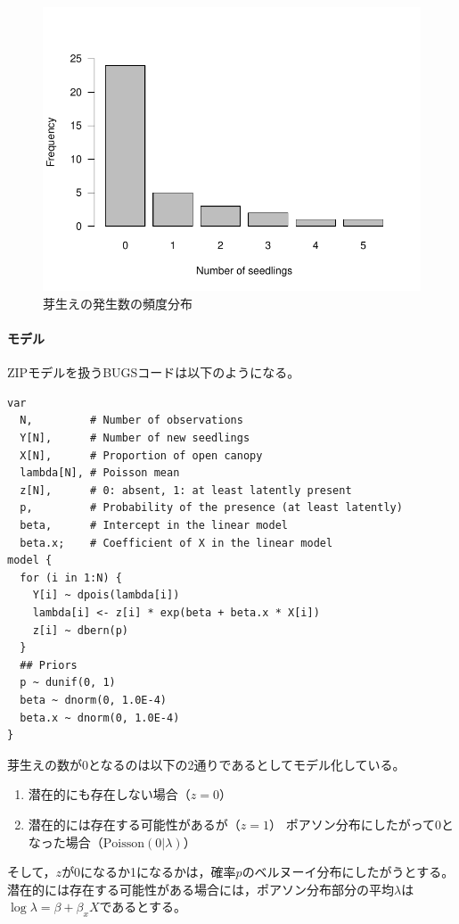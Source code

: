 \documentclass[11pt,uplatex]{jsarticle}
\begin{document}
\begin{figure}[hbtp]
  \begin{center}
    \includegraphics[bb=0 0 360 270, clip, width=300 bp]{example4_barplot.pdf}
  \end{center}
  \caption{芽生えの発生数の頻度分布}
  \label{example4_barplot}
\end{figure}


\paragraph{モデル}
ZIPモデルを扱うBUGSコードは以下のようになる。

\begin{lstlisting}
var
  N,         # Number of observations
  Y[N],      # Number of new seedlings
  X[N],      # Proportion of open canopy
  lambda[N], # Poisson mean
  z[N],      # 0: absent, 1: at least latently present
  p,         # Probability of the presence (at least latently)
  beta,      # Intercept in the linear model
  beta.x;    # Coefficient of X in the linear model
model {
  for (i in 1:N) {
    Y[i] ~ dpois(lambda[i])
    lambda[i] <- z[i] * exp(beta + beta.x * X[i])
    z[i] ~ dbern(p)
  }
  ## Priors
  p ~ dunif(0, 1)
  beta ~ dnorm(0, 1.0E-4)
  beta.x ~ dnorm(0, 1.0E-4)
}
\end{lstlisting}


芽生えの数が0となるのは以下の2通りであるとしてモデル化している。
\begin{enumerate}
\item 潜在的にも存在しない場合（$z=0$）
\item 潜在的には存在する可能性があるが（$z=1$）
ポアソン分布にしたがって0となった場合（$\mathrm{Poisson}(0|\lambda)$）
\end{enumerate}
そして，$z$が0になるか1になるかは，確率$p$のベルヌーイ分布にしたがうとする。
潜在的には存在する可能性がある場合には，ポアソン分布部分の平均$\lambda$は
$\log\lambda = \beta + \beta_{x}X$であるとする。
\end{document}
